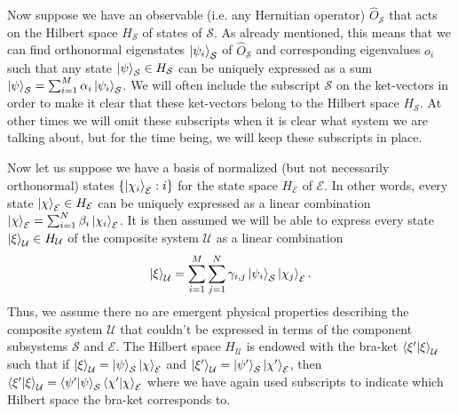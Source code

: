     Now suppose we have an observable (i.e. any Hermitian operator) $\hat{O}_{\mathcal{S}}$ that acts on the Hilbert space $H_\mathcal{S}$ of states of $\mathcal{S}$. As already mentioned, this means that we can find orthonormal eigenstates $\ket{\psi_i}_\mathcal{S}$ of $\hat{O}_{\mathcal{S}}$ and corresponding eigenvalues $o_i$ such that any state $\ket{\psi}_\mathcal{S}\in H_\mathcal{S}$ can be uniquely expressed as a sum $\ket{\psi}_\mathcal{S}=\sum_{i=1}^M\alpha_i\ket{\psi_i}_\mathcal{S}$. We will often include the subscript $\mathcal{S}$ on the ket-vectors in order to make it clear that these ket-vectors belong to the Hilbert space $H_\mathcal{S}$. At other times we will omit these subscripts when it is clear what system we are talking about, but for the time being, we will keep these subscripts in place.
     
      Now let us suppose we have a basis of normalized (but not necessarily orthonormal) states $\{\ket{\chi_i}_\mathcal{E}:i\}$ for the state space $H_\mathcal{E}$ of $\mathcal{E}$. In other words, every state $\ket{\chi}_\mathcal{E}\in H_\mathcal{E}$ can be uniquely expressed as a linear combination $\ket{\chi}_\mathcal{E}=\sum_{i=1}^N\beta_i\ket{\chi_i}_\mathcal{E}$. It is then assumed we will be able to express every state $\ket{\xi}_\mathcal{U}\in H_\mathcal{U}$ of the composite system $\mathcal{U}$ as a linear combination
      \begin{equation}\label{entangled}\ket{\xi}_\mathcal{U}=\sum_{i=1}^M\sum_{j=1}^N\gamma_{i,j}\ket{\psi_i}_\mathcal{S}\ket{\chi_j}_\mathcal{E}.
      \end{equation}
      Thus, we assume there no are emergent physical properties describing the composite system $\mathcal{U}$ that couldn't be expressed in terms of the component subsystems $\mathcal{S}$ and $\mathcal{E}$. 
      The Hilbert space $H_\mathcal{U}$ is  endowed with the bra-ket $\ip{\xi'}{\xi}_\mathcal{U}$ such that if $\ket{\xi}_\mathcal{U}=\ket{\psi}_\mathcal{S}\ket{\chi}_\mathcal{E}$ and $\ket{\xi'}_\mathcal{U}=\ket{\psi'}_\mathcal{S}\ket{\chi'}_\mathcal{E}$, then $\ip{\xi'}{\xi}_\mathcal{U}=\ip{\psi'}{\psi}_\mathcal{S}\ip{\chi'}{\chi}_\mathcal{E}$ where we have again used subscripts to indicate which Hilbert space the bra-ket corresponds to. 
      
